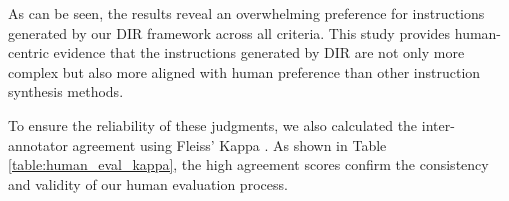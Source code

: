 \begin{table}[!t]
\centering
\caption{Pairwise human evaluation for data quality.}
\renewcommand{\arraystretch}{0.95}
\label{table:human_eval_results}
\end{table}

\begin{table}[!t]
\centering
\renewcommand{\arraystretch}{1.0}
\caption{Inter-annotator agreement for pairwise human evaluation.}
\label{table:human_eval_kappa}
\end{table}

As can be seen, the results reveal an overwhelming preference for instructions generated by our DIR framework across all criteria. This study provides human-centric evidence that the instructions generated by DIR are not only more complex but also more aligned with human preference than other instruction synthesis methods. 

To ensure the reliability of these judgments, we also calculated the inter-annotator agreement using Fleiss' Kappa \citep{fleiss1971measuring}. As shown in Table \ref{table:human_eval_kappa}, the high agreement scores confirm the consistency and validity of our human evaluation process.